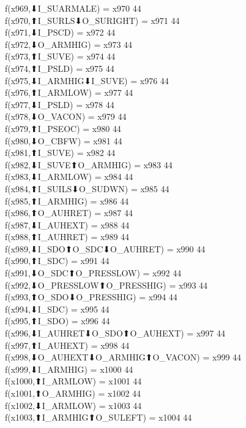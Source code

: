 f(x969,⬇I_SUARMALE) = x970 {44} \\
f(x970,⬆I_SURLS⬇O_SURIGHT) = x971 {44} \\
f(x971,⬇I_PSCD) = x972 {44} \\
f(x972,⬇O_ARMHIG) = x973 {44} \\
f(x973,⬆I_SUVE) = x974 {44} \\
f(x974,⬆I_PSLD) = x975 {44} \\
f(x975,⬇I_ARMHIG⬇I_SUVE) = x976 {44} \\
f(x976,⬆I_ARMLOW) = x977 {44} \\
f(x977,⬇I_PSLD) = x978 {44} \\
f(x978,⬇O_VACON) = x979 {44} \\
f(x979,⬆I_PSEOC) = x980 {44} \\
f(x980,⬇O_CBFW) = x981 {44} \\
f(x981,⬆I_SUVE) = x982 {44} \\
f(x982,⬇I_SUVE⬆O_ARMHIG) = x983 {44} \\
f(x983,⬇I_ARMLOW) = x984 {44} \\
f(x984,⬆I_SUILS⬇O_SUDWN) = x985 {44} \\
f(x985,⬆I_ARMHIG) = x986 {44} \\
f(x986,⬆O_AUHRET) = x987 {44} \\
f(x987,⬇I_AUHEXT) = x988 {44} \\
f(x988,⬆I_AUHRET) = x989 {44} \\
f(x989,⬇I_SDO⬆O_SDC⬇O_AUHRET) = x990 {44} \\
f(x990,⬆I_SDC) = x991 {44} \\
f(x991,⬇O_SDC⬆O_PRESSLOW) = x992 {44} \\
f(x992,⬇O_PRESSLOW⬆O_PRESSHIG) = x993 {44} \\
f(x993,⬆O_SDO⬇O_PRESSHIG) = x994 {44} \\
f(x994,⬇I_SDC) = x995 {44} \\
f(x995,⬆I_SDO) = x996 {44} \\
f(x996,⬇I_AUHRET⬇O_SDO⬆O_AUHEXT) = x997 {44} \\
f(x997,⬆I_AUHEXT) = x998 {44} \\
f(x998,⬇O_AUHEXT⬇O_ARMHIG⬆O_VACON) = x999 {44} \\
f(x999,⬇I_ARMHIG) = x1000 {44} \\
f(x1000,⬆I_ARMLOW) = x1001 {44} \\
f(x1001,⬆O_ARMHIG) = x1002 {44} \\
f(x1002,⬇I_ARMLOW) = x1003 {44} \\
f(x1003,⬆I_ARMHIG⬆O_SULEFT) = x1004 {44} \\
